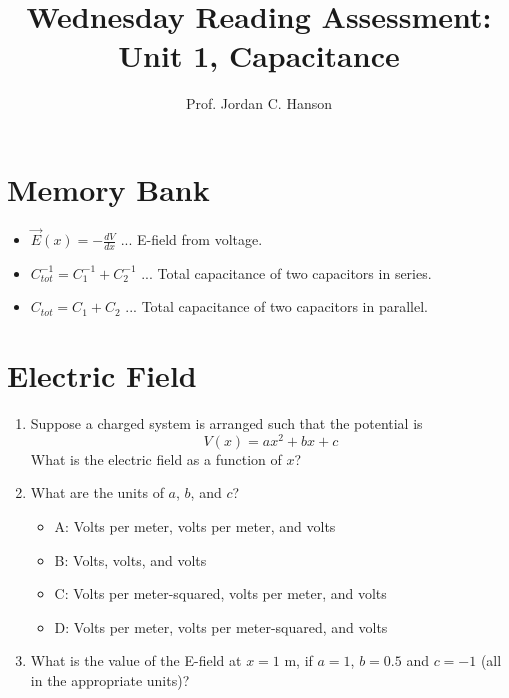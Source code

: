 \documentclass{article}
\begin{document}
\title{Wednesday Reading Assessment: Unit 1, Capacitance}
\author{Prof. Jordan C. Hanson}

\maketitle

\section{Memory Bank}

\begin{itemize}
\item $\vec{E}(x) = -\frac{dV}{dx}$ ... E-field from voltage.
\item $C_{tot}^{-1} = C_1^{-1} + C_2^{-1}$ ... Total capacitance of two capacitors in series.
\item $C_{tot} = C_1 + C_2$ ... Total capacitance of two capacitors in parallel.
\end{itemize}

\section{Electric Field}

\begin{enumerate}
\item Suppose a charged system is arranged such that the potential is
\begin{equation}
V(x) = a x ^2 + b x + c
\end{equation}
What is the electric field as a function of $x$? \\ \vspace{0.25cm}
\item What are the units of $a$, $b$, and $c$?
\begin{itemize}
\item A: Volts per meter, volts per meter, and volts
\item B: Volts, volts, and volts
\item C: Volts per meter-squared, volts per meter, and volts
\item D: Volts per meter, volts per meter-squared, and volts
\end{itemize}
\item What is the value of the E-field at $x=1$ m, if $a = 1$, $b = 0.5$ and $c=-1$ (all in the appropriate units)? \\ \vspace{1cm}
\end{enumerate}
\end{document}
